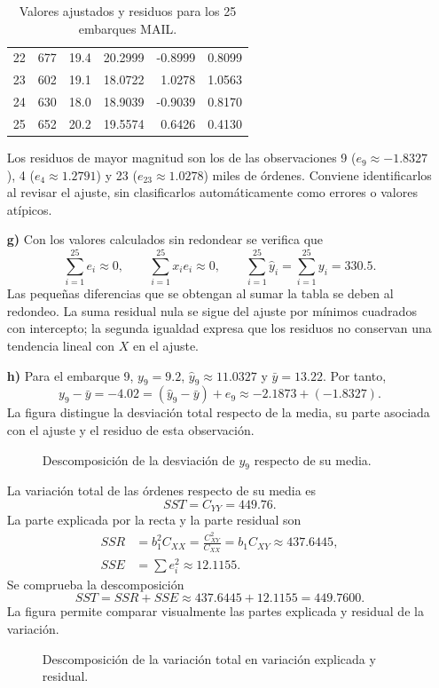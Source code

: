 \begin{enumerate}
\begin{table}[H]
\begin{tabular}{r r r r r r}
22 & 677 & 19.4 & 20.2999 & -0.8999 & 0.8099 \\
23 & 602 & 19.1 & 18.0722 & 1.0278 & 1.0563 \\
24 & 630 & 18.0 & 18.9039 & -0.9039 & 0.8170 \\
25 & 652 & 20.2 & 19.5574 & 0.6426 & 0.4130 \\
    \hline
    \end{tabular}
    \caption{Valores ajustados y residuos para los 25 embarques MAIL.}
    \label{tab:clase4-mail-residuos-integrador}
    \end{table}
    Los residuos de mayor magnitud son los de las observaciones 9 ($e_9\approx-1.8327$), 4 ($e_4\approx1.2791$) y 23 ($e_{23}\approx1.0278$) miles de órdenes. Conviene identificarlos al revisar el ajuste, sin clasificarlos automáticamente como errores o valores atípicos.

    \item[\textbf{g)}] Con los valores calculados sin redondear se verifica que
    \[
    \sum_{i=1}^{25}e_i\approx0,\qquad
    \sum_{i=1}^{25}x_ie_i\approx0,\qquad
    \sum_{i=1}^{25}\widehat y_i=\sum_{i=1}^{25}y_i=330.5.
    \]
    Las pequeñas diferencias que se obtengan al sumar la tabla se deben al redondeo. La suma residual nula se sigue del ajuste por mínimos cuadrados con intercepto; la segunda igualdad expresa que los residuos no conservan una tendencia lineal con $X$ en el ajuste.

    \item[\textbf{h)}] Para el embarque 9, $y_9=9.2$, $\widehat y_9\approx11.0327$ y $\bar y=13.22$. Por tanto,
    \[
    y_9-\bar y=-4.02=(\widehat y_9-\bar y)+e_9
    \approx-2.1873+(-1.8327).
    \]
    La figura distingue la desviación total respecto de la media, su parte asociada con el ajuste y el residuo de esta observación.
    \begin{figure}[H]
    \centering
    
    \caption{Descomposición de la desviación de $y_9$ respecto de su media.}
    \label{fig:clase4-mail-integrador-descomposicion}
    \end{figure}
    La variación total de las órdenes respecto de su media es
    \[
    SST=C_{YY}=449.76.
    \]
    La parte explicada por la recta y la parte residual son
    \begin{align*}
    SSR&=b_1^2C_{XX}=\frac{C_{XY}^2}{C_{XX}}=b_1C_{XY}\approx437.6445,\\
    SSE&=\sum e_i^2\approx12.1155.
    \end{align*}
    Se comprueba la descomposición
    \[
    SST=SSR+SSE\approx437.6445+12.1155=449.7600.
    \]
    La figura permite comparar visualmente las partes explicada y residual de la variación.
    \begin{figure}[H]
    \centering
    
    \caption{Descomposición de la variación total en variación explicada y residual.}
    \label{fig:clase4-mail-integrador-variacion}
    \end{figure}


\end{enumerate}
